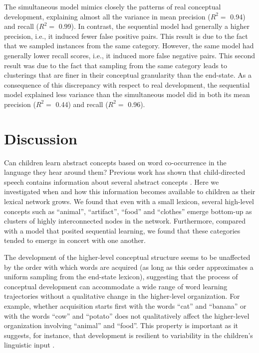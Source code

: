 \documentclass[11pt]{article}
\begin{document}
The simultaneous model mimics closely the patterns of real conceptual
development, explaining almost all the variance in mean precision
(\(R^2 =\) 0.94) and recall (\(R^2 =\) 0.99). In contrast, the
sequential model had generally a higher precision, i.e., it induced
fewer false positive pairs. This result is due to the fact that we
sampled instances from the same category. However, the same model had
generally lower recall scores, i.e., it induced more false negative
pairs. This second result was due to the fact that sampling from the
same category leads to clusterings that are finer in their conceptual
granularity than the end-state. As a consequence of this discrepancy
with respect to real development, the sequential model explained less
variance than the simultaneous model did in both its mean precision
(\(R^2 =\) 0.44) and recall (\(R^2 =\) 0.96).

\section{Discussion}\label{discussion}

Can children learn abstract concepts based on word co-occurrence in the
language they hear around them? Previous work has shown that
child-directed speech contains information about several abstract
concepts \cite{huebner2018}. Here we investigated when and how this
information becomes available to children as their lexical network
grows. We found that even with a small lexicon, several high-level
concepts such as ``animal'', ``artifact'', ``food'' and ``clothes''
emerge bottom-up as clusters of highly interconnected nodes in the
network. Furthermore, compared with a model that posited sequential
learning, we found that these categories tended to emerge in concert
with one another.

The development of the higher-level conceptual structure seems to be
unaffected by the order with which words are acquired (as long as this
order approximates a uniform sampling from the end-state lexicon),
suggesting that the process of conceptual development can accommodate a
wide range of word learning trajectories without a qualitative change in
the higher-level organization. For example, whether acquisition starts
first with the words ``cat'' and ``banana'' or with the words ``cow''
and ``potato'' does not qualitatively affect the higher-level
organization involving ``animal'' and ``food''. This property is
important as it suggests, for instance, that development is resilient to
variability in the children's linguistic input
\cite{slobin2014,hart1995}.
\end{document}
